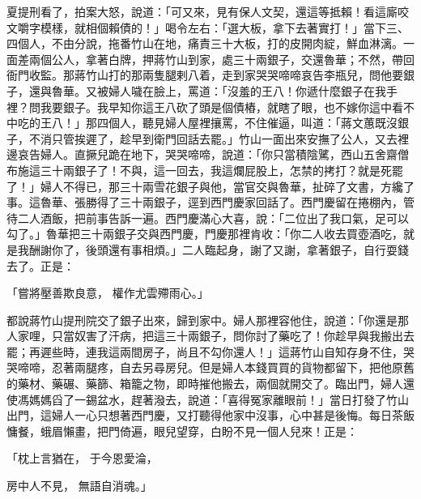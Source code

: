 夏提刑看了，拍案大怒，說道：「可又來，見有保人文契，還這等抵賴！看這廝咬文嚼字模樣，就相個賴債的！」喝令左右：「選大板，拿下去著實打！」當下三、四個人，不由分說，拖番竹山在地，痛責三十大板，打的皮開肉綻，鮮血淋漓。一面差兩個公人，拿著白牌，押蔣竹山到家，處三十兩銀子，交還魯華；不然，帶回衙門收監。那蔣竹山打的那兩隻腿剌八着，走到家哭哭啼啼哀告李瓶兒，問他要銀子，還與魯華。又被婦人噦在臉上，罵道：「沒羞的王八！你遞什麼銀子在我手裡？問我要銀子。我早知你這王八砍了頭是個債樁，就瞎了眼，也不嫁你這中看不中吃的王八！」那四個人，聽見婦人屋裡攘罵，不住催逼，叫道：「蔣文蕙既沒銀子，不消只管挨遲了，趁早到衛門回話去罷。」竹山一面出來安撫了公人，又去裡邊哀告婦人。直撅兒跪在地下，哭哭啼啼，說道：「你只當積陰騭，西山五舍齋僧布施這三十兩銀子了！不與，這一回去，我這爛屁股上，怎禁的拷打？就是死罷了！」婦人不得已，那三十兩雪花銀子與他，當官交與魯華，扯碎了文書，方纔了事。這魯華、張勝得了三十兩銀子，逕到西門慶家回話了。西門慶留在捲棚內，管待二人酒飯，把前事告訴一遍。西門慶滿心大喜，說：「二位出了我口氣，足可以勾了。」魯華把三十兩銀子交與西門慶，門慶那裡肯收：「你二人收去買壺酒吃，就是我酬謝你了，後頭還有事相煩。」二人臨起身，謝了又謝，拿著銀子，自行耍錢去了。正是：

「嘗將壓善欺良意，  權作尤雲殢雨心。」

都說蔣竹山提刑院交了銀子出來，歸到家中。婦人那裡容他住，說道：「你還是那人家哩，只當奴害了汗病，把這三十兩銀子，問你討了藥吃了！你趁早與我搬出去罷；再遲些時，連我這兩間房子，尚且不勾你還人！」這蔣竹山自知存身不住，哭哭啼啼，忍著兩腿疼，自去另尋房兒。但是婦人本錢買買的貨物都留下，把他原舊的藥材、藥碾、藥篩、箱籠之物，即時摧他搬去，兩個就開交了。臨出門，婦人還使馮媽媽舀了一錫盆水，趕著潑去，說道：「喜得冤家離眼前！」當日打發了竹山出門，這婦人一心只想著西門慶，又打聽得他家中沒事，心中甚是後悔。每日茶飯慵餐，蛾眉懶畫，把門倚遍，眼兒望穿，白盼不見一個人兒來！正是：

「枕上言猶在，  于今恩愛淪，

房中人不見，  無語自消魂。」

